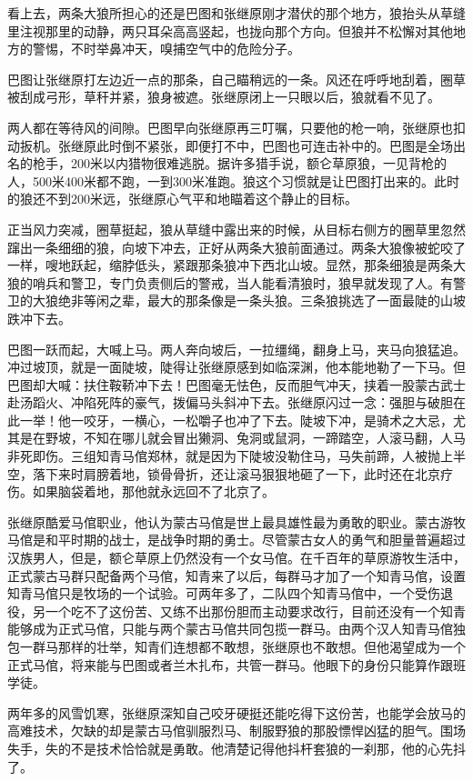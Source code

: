 \par 看上去，两条大狼所担心的还是巴图和张继原刚才潜伏的那个地方，狼抬头从草缝里注视那里的动静，两只耳朵高高竖起，也拢向那个方向。但狼并不松懈对其他地方的警惕，不时举鼻冲天，嗅捕空气中的危险分子。
\par 巴图让张继原打左边近一点的那条，自己瞄稍远的一条。风还在呼呼地刮着，圈草被刮成弓形，草秆并紧，狼身被遮。张继原闭上一只眼以后，狼就看不见了。
\par 两人都在等待风的间隙。巴图早向张继原再三叮嘱，只要他的枪一响，张继原也扣动扳机。张继原此时倒不紧张，即便打不中，巴图也可连击补中的。巴图是全场出名的枪手，200米以内猎物很难逃脱。据许多猎手说，额仑草原狼，一见背枪的人，500米400米都不跑，一到300米准跑。狼这个习惯就是让巴图打出来的。此时的狼还不到200米远，张继原心气平和地瞄着这个静止的目标。
\par 正当风力突减，圈草挺起，狼从草缝中露出来的时候，从目标右侧方的圈草里忽然蹿出一条细细的狼，向坡下冲去，正好从两条大狼前面通过。两条大狼像被蛇咬了一样，嗖地跃起，缩脖低头，紧跟那条狼冲下西北山坡。显然，那条细狼是两条大狼的哨兵和警卫，专门负责侧后的警戒，当人能看清狼时，狼早就发现了人。有警卫的大狼绝非等闲之辈，最大的那条像是一条头狼。三条狼挑选了一面最陡的山坡跌冲下去。
\par 巴图一跃而起，大喊上马。两人奔向坡后，一拉缰绳，翻身上马，夹马向狼猛追。冲过坡顶，就是一面陡坡，陡得让张继原感到如临深渊，他本能地勒了一下马。但巴图却大喊：扶住鞍鞒冲下去！巴图毫无怯色，反而胆气冲天，挟着一股蒙古武士赴汤蹈火、冲陷死阵的豪气，拨偏马头斜冲下去。张继原闪过一念：强胆与破胆在此一举！他一咬牙，一横心，一松嚼子也冲了下去。陡坡下冲，是骑术之大忌，尤其是在野坡，不知在哪儿就会冒出獭洞、兔洞或鼠洞，一蹄踏空，人滚马翻，人马非死即伤。三组知青马倌郑林，就是因为下陡坡没勒住马，马失前蹄，人被抛上半空，落下来时肩膀着地，锁骨骨折，还让滚马狠狠地砸了一下，此时还在北京疗伤。如果脑袋着地，那他就永远回不了北京了。
\par 张继原酷爱马倌职业，他认为蒙古马倌是世上最具雄性最为勇敢的职业。蒙古游牧马倌是和平时期的战士，是战争时期的勇士。尽管蒙古女人的勇气和胆量普遍超过汉族男人，但是，额仑草原上仍然没有一个女马倌。在千百年的草原游牧生活中，正式蒙古马群只配备两个马倌，知青来了以后，每群马才加了一个知青马倌，设置知青马倌只是牧场的一个试验。可两年多了，二队四个知青马倌中，一个受伤退役，另一个吃不了这份苦、又练不出那份胆而主动要求改行，目前还没有一个知青能够成为正式马倌，只能与两个蒙古马倌共同包揽一群马。由两个汉人知青马倌独包一群马那样的壮举，知青们连想都不敢想，张继原也不敢想。但他渴望成为一个正式马倌，将来能与巴图或者兰木扎布，共管一群马。他眼下的身份只能算作跟班学徒。
\par 两年多的风雪饥寒，张继原深知自己咬牙硬挺还能吃得下这份苦，也能学会放马的高难技术，欠缺的却是蒙古马倌驯服烈马、制服野狼的那股慓悍凶猛的胆气。围场失手，失的不是技术恰恰就是勇敢。他清楚记得他抖杆套狼的一刹那，他的心先抖了。
